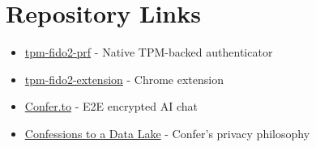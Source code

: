 \documentclass{article}
\begin{document}
\section{Repository Links}

\begin{itemize}
\item \href{https://github.com/vitorpy/tpm-fido2-prf}{tpm-fido2-prf} - Native TPM-backed authenticator

\item \href{https://github.com/vitorpy/tpm-fido2-extension}{tpm-fido2-extension} - Chrome extension

\item \href{https://confer.to}{Confer.to} - E2E encrypted AI chat

\item \href{https://confer.to/blog/2025/12/confessions-to-a-data-lake/}{Confessions to a Data Lake} - Confer's privacy philosophy

\end{itemize}


\end{document}
